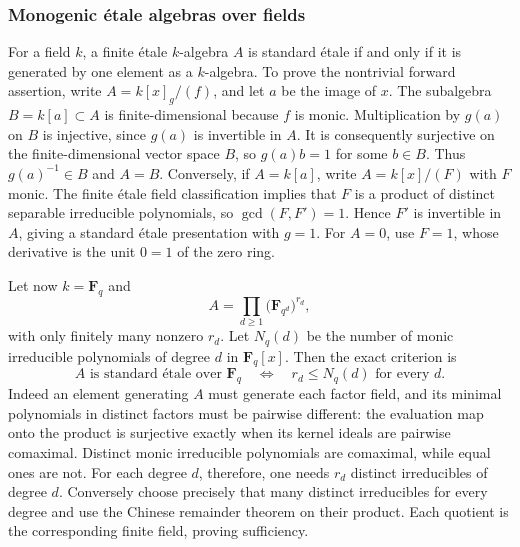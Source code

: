 \subsubsection{Monogenic étale algebras over fields}\label{algebra-proof-052-monogenic-uxe9tale-algebras-over-fields}

For a field \(k\), a finite étale \(k\)-algebra \(A\) is standard étale if and only if it is generated by one element as a \(k\)-algebra. To prove the nontrivial forward assertion, write \(A=k[x]_g/(f)\), and let \(a\) be the image of \(x\). The subalgebra \(B=k[a]\subset A\) is finite-dimensional because \(f\) is monic. Multiplication by \(g(a)\) on \(B\) is injective, since \(g(a)\) is invertible in \(A\). It is consequently surjective on the finite-dimensional vector space \(B\), so \(g(a)b=1\) for some \(b\in B\). Thus \(g(a)^{-1}\in B\) and \(A=B\). Conversely, if \(A=k[a]\), write \(A=k[x]/(F)\) with \(F\) monic. The finite étale field classification implies that \(F\) is a product of distinct separable irreducible polynomials, so \(\gcd(F,F')=1\). Hence \(F'\) is invertible in \(A\), giving a standard étale presentation with \(g=1\). For \(A=0\), use \(F=1\), whose derivative is the unit \(0=1\) of the zero ring.

Let now \(k=\mathbf F_q\) and \[
A=\prod_{d\ge1}\bigl(\mathbf F_{q^d}\bigr)^{r_d},
\] with only finitely many nonzero \(r_d\). Let \(N_q(d)\) be the number of monic irreducible polynomials of degree \(d\) in \(\mathbf F_q[x]\). Then the exact criterion is \[
A\text{ is standard étale over }\mathbf F_q
\quad\Longleftrightarrow\quad
r_d\le N_q(d)\text{ for every }d.
\] Indeed an element generating \(A\) must generate each factor field, and its minimal polynomials in distinct factors must be pairwise different: the evaluation map onto the product is surjective exactly when its kernel ideals are pairwise comaximal. Distinct monic irreducible polynomials are comaximal, while equal ones are not. For each degree \(d\), therefore, one needs \(r_d\) distinct irreducibles of degree \(d\). Conversely choose precisely that many distinct irreducibles for every degree and use the Chinese remainder theorem on their product. Each quotient is the corresponding finite field, proving sufficiency.

